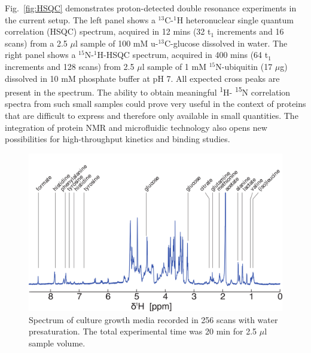 \documentclass[preprint,5p]{elsarticle}
\newcommand{\fig}[1]{Fig.~\ref{#1}}
\begin{document}
\fig{fig:HSQC} demonstrates proton-detected double resonance experiments in the current setup. 
The left panel shows a $^{13}$C-$^{1}$H heteronuclear single quantum correlation (HSQC) spectrum, acquired in 12 mins 
(32 t$_1$ increments and 16 scans) 
from a 2.5 $\mu$l sample of 100 mM u-$^{13}$C-glucose dissolved in water. The right panel shows a 
$^{15}$N-$^{1}$H-HSQC spectrum, acquired in 400 mins (64 t$_1$ increments and 128 scans) 
from 2.5 $\mu$l sample of 1 mM $^{15}$N-ubiquitin (17 $\mu$g) dissolved in 10 mM phosphate buffer at pH 7. 
All expected cross peaks are present in the spectrum. The ability to obtain meaningful  \textsuperscript{1}H-
\textsuperscript{15}N correlation spectra from such small samples could prove very useful in the context of
proteins that are difficult to express and therefore only available in small quantities. The integration of
protein NMR and microfluidic technology also opens new possibilities for high-throughput kinetics and 
binding studies. 

\begin{figure}
\centering
\includegraphics[width=.7\linewidth,keepaspectratio=true]{./figures/media-180125-005-bigger-font.png} 
\caption{Spectrum of culture growth media recorded in 256 scans with water presaturation. The total experimental time was 20 min for 2.5 $\mu$l sample volume.}
\label{fig:media-spec} 
\end{figure}
\end{document}
